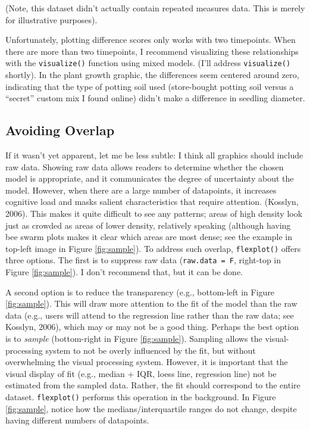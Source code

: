 \documentclass[
  man]{apa6}
\begin{document}
\noindent (Note, this dataset didn't actually contain repeated measures data. This is merely for illustrative purposes).

Unfortunately, plotting difference scores only works with two timepoints. When there are more than two timepoints, I recommend visualizing these relationships with the \texttt{visualize()} function using mixed models. (I'll address \texttt{visualize()} shortly). In the plant growth graphic, the differences seem centered around zero, indicating that the type of potting soil used (store-bought potting soil versus a \enquote{secret} custom mix I found online) didn't make a difference in seedling diameter.

\hypertarget{avoiding-overlap}{%
\subsection{Avoiding Overlap}\label{avoiding-overlap}}

If it wasn't yet apparent, let me be less subtle: I think all graphics should include raw data. Showing raw data allows readers to determine whether the chosen model is appropriate, and it communicates the degree of uncertainty about the model. However, when there are a large number of datapoints, it increases cognitive load and masks salient characteristics that require attention. (Kosslyn, 2006). This makes it quite difficult to see any patterns; areas of high density look just as crowded as areas of lower density, relatively speaking (although having bee swarm plots makes it clear which areas are most dense; see the example in top-left image in Figure \ref{fig:sample}). To address such overlap, \texttt{flexplot()} offers three options. The first is to suppress raw data (\texttt{raw.data\ =\ F}, right-top in Figure \ref{fig:sample}). I don't recommend that, but it can be done.

A second option is to reduce the transparency (e.g., bottom-left in Figure \ref{fig:sample}). This will draw more attention to the fit of the model than the raw data (e.g., users will attend to the regression line rather than the raw data; see Kosslyn, 2006), which may or may not be a good thing. Perhaps the best option is to \emph{sample} (bottom-right in Figure \ref{fig:sample}). Sampling allows the visual-processing system to not be overly influenced by the fit, but without overwhelming the visual processing system. However, it is important that the visual display of fit (e.g., median + IQR, loess line, regression line) not be estimated from the sampled data. Rather, the fit should correspond to the entire dataset. \texttt{flexplot()} performs this operation in the background. In Figure \ref{fig:sample}, notice how the medians/interquartile ranges do not change, despite having different numbers of datapoints.
\end{document}
